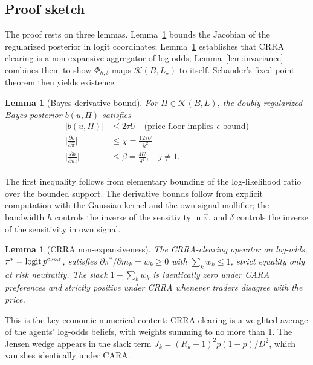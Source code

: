 \documentclass[11pt]{article}
\newtheorem{lemma}[theorem]{Lemma}
\newcommand{\1}{\mathbf{1}}
\begin{document}
\subsection{Proof sketch}

The proof rests on three lemmas.  Lemma~\ref{lem:bayes-bound} bounds the
Jacobian of the regularized posterior in logit coordinates;
Lemma~\ref{lem:clear-nonexpansive} establishes that CRRA clearing is a
non-expansive aggregator of log-odds; Lemma~\ref{lem:invariance}
combines them to show $\Phi_{h,\delta}$ maps $\mathcal{K}(B, L_\star)$ to
itself.  Schauder's fixed-point theorem then yields existence.

\begin{lemma}[Bayes derivative bound]\label{lem:bayes-bound}
For $\Pi \in \mathcal{K}(B, L)$, the doubly-regularized Bayes
posterior $b(u, \Pi)$ satisfies
\begin{align}
|b(u, \Pi)| &\le 2\tau U \quad\text{(price floor implies $\epsilon$ bound)}\\
\biggl|\frac{\partial b}{\partial \hat\pi}\biggr| &\le \chi = \frac{12\tau U}{h^2}\\
\biggl|\frac{\partial b}{\partial u_j}\biggr| &\le \beta = \frac{4U}{\delta^2}, \quad j\ne 1.
\end{align}
\end{lemma}

The first inequality follows from elementary bounding of the
log-likelihood ratio over the bounded support.  The derivative bounds
follow from explicit computation with the Gaussian kernel and the
own-signal mollifier; the bandwidth $h$ controls the inverse of the
sensitivity in $\hat\pi$, and $\delta$ controls the inverse of the
sensitivity in own signal.

\begin{lemma}[CRRA non-expansiveness]\label{lem:clear-nonexpansive}
The CRRA-clearing operator on log-odds, $\pi^* = \mathrm{logit}\,p^{\rm clear}$,
satisfies $\partial \pi^* / \partial m_k = w_k \ge 0$ with $\sum_k w_k \le 1$,
strict equality only at risk neutrality.  The slack $1 - \sum_k w_k$ is
identically zero under CARA preferences and strictly positive under CRRA
whenever traders disagree with the price.
\end{lemma}

This is the key economic-numerical content: CRRA clearing is a weighted
average of the agents' log-odds beliefs, with weights summing to no
more than 1.  The Jensen wedge appears in the slack term $J_k = (R_k -
1)^2 p(1-p)/D^2$, which vanishes identically under CARA.
\end{document}
